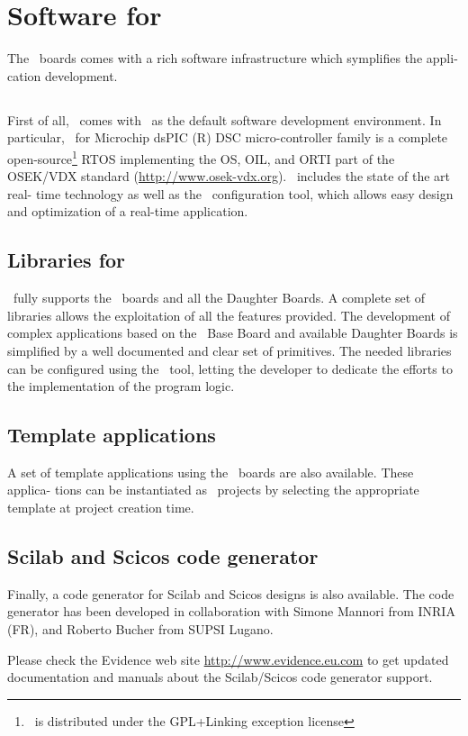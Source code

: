 \chapter{Software for \flex}
\label{ch:software}
The \flex\ boards comes with a rich software infrastructure which symplifies the appli-
cation development.

\section{\ee}
First of all, \flex\ comes with \ee\ as the default software
development environment. In particular, \ee\ for Microchip dsPIC (R)
DSC micro-controller family is a complete open-source\footnote{\ee\ is
distributed under the GPL+Linking exception license} RTOS implementing
the OS, OIL, and ORTI part of the OSEK/VDX standard
(\url{http://www.osek-vdx.org}). \ee\ includes the state of the art
real- time technology as well as the \rtd\ configuration tool, which
allows easy design and optimization of a real-time application.

\section{Libraries for \flex}
\ee\ fully supports the \flex\ boards and all the
Daughter Boards. A complete set of libraries allows the exploitation
of all the features provided. The development of complex applications
based on the \flex\ Base Board and available Daughter Boards is
simplified by a well documented and clear set of primitives.  The
needed libraries can be configured using the \rtd\ tool, letting the
developer to dedicate the efforts to the implementation of the program
logic.

\section{Template applications}
A set of template applications using the \flex\ boards are also
available. These applica- tions can be instantiated as \rtd\ projects
by selecting the appropriate template at project creation time.

\section{Scilab and Scicos code generator}
Finally, a code generator for Scilab and Scicos designs is also
available. The code generator has been developed in collaboration
with Simone Mannori from INRIA (FR), and Roberto Bucher from SUPSI
Lugano. 

Please check the Evidence web site
\url{http://www.evidence.eu.com} to get updated documentation and
manuals about the Scilab/Scicos code generator support.

